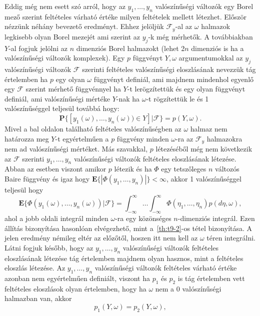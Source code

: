 \documentclass{article}
\begin{document}
Eddig még nem esett szó arról, hogy az $y_1,\ldots,y_n$ valószínűségi változók egy Borel mező szerint feltételes várható értéke milyen feltételek mellett létezhet. Először nézzünk néhány bevezető eredményt. Ehhez jelöljük $\mathscr{F}_y$-al az $\omega$ halmazok legkisebb olyan Borel mezejét ami szerint az $y_j$-k még mérhetők. A továbbiakban $Y$-al fogjuk jelölni az $n$ dimenziós Borel halmazokt (lehet 2$n$ dimenziós is ha a valószínűségi változók komplexek). Egy $p$ függvényt $Y,\omega$ argumentumokkal az $y_j$ valószínűségi változók $\mathscr{F}$ szerinti feltételes valószínűségi eloszlásának nevezzük tág értelemben ha $p$ egy olyan $\omega$ függvényt definiál, ami majdnem mindenhol egyenlő egy $\mathscr{F}$ szerint mérhető függvénnyel ha $Y$-t lerögzítettük és egy olyan függvényt definiál, ami valószínűségi mértéke $Y$-nak ha $\omega$-t rögzítettük le és 1 valószínűséggel teljesül továbbá hogy:
\[
	\mathrm{\textbf{P}}\{ [y_1(\omega),\ldots,y_n(\omega)) \in Y ] | \mathscr{F} \} = p(Y,\omega) .
\]
Mivel a bal oldalon található feltételes valószínűségben az $\omega$ halmaz nem határozza meg $Y$-t egyértelműen a $p$ függvény minden $\omega$-ra az $\mathscr{F}_y$ halmazokra nem ad valószínűségi mértéket. Más szavakkal, $p$ létezéséből még nem következik az $\mathscr{F}$ szerinti $y_1,\ldots,y_n$ valószínűségi változók feltételes eloszlásának létezése. Abban az esetben viszont amikor $p$ létezik és ha $\Phi$ egy tetszőleges $n$ változós Baire függvény és igaz hogy $\mathrm{\textbf{E}}\{ |\Phi(y_1,\ldots,y_n)| \} < \infty$, akkor 1 valószínűséggel teljesül hogy
\begin{equation}
	\mathrm{\textbf{E}}\{ \Phi(y_1(\omega),\ldots,y_n(\omega))  | \mathscr{F} \} = \int^{\infty}_{-\infty} \ldots \int^{\infty}_{-\infty} \Phi(\eta_1,\ldots,\eta_n) p(d\eta,\omega) ,
\end{equation}
ahol a jobb oldali integrál minden $\omega$-ra egy közönséges $n$-dimenziós integrál. Ezen állítás bizonyítása hasonlóan elvégezhető, mint a~\ref{th:t9-2}-os tétel bizonyítása. A jelen eredmény némileg eltér az előzőtől, hoszen itt nem kell az $\omega$ téren integrálni. Látni fogjuk később, hogy az $y_1,\ldots,y_n$ valószínűségi változók feltételes eloszlásának létezése tág értelemben majdnem olyan hasznos, mint a feltételes eloszlás létezése. Az $y_1,\ldots,y_n$ valószínűségi változók feltételes várható értéke azonban nem egyértelműen definiált, viszont ha $p_1$ és $p_2$ is tág értelemben vett feltételes eloszlások olyan értelemben, hogy ha $\omega$ nem a 0 valószínűségi halmazban van, akkor 
\[
	p_1(Y,\omega) = p_2(Y,\omega),
\]
\end{document}
